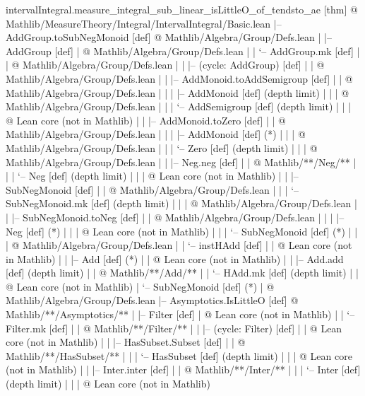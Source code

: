 \documentclass[11pt,reqno]{amsart}
\begin{document}
\begin{verbatimbox}
intervalIntegral.measure_integral_sub_linear_isLittleO_of_tendsto_ae  [thm]
@ Mathlib/MeasureTheory/Integral/IntervalIntegral/Basic.lean
|-- AddGroup.toSubNegMonoid  [def]
@ Mathlib/Algebra/Group/Defs.lean
|   |-- AddGroup  [def]
|   @ Mathlib/Algebra/Group/Defs.lean
|   |   `-- AddGroup.mk  [def]
|   |   @ Mathlib/Algebra/Group/Defs.lean
|   |       |-- (cycle: AddGroup)  [def]
|   |       @ Mathlib/Algebra/Group/Defs.lean
|   |       |-- AddMonoid.toAddSemigroup  [def]
|   |       @ Mathlib/Algebra/Group/Defs.lean
|   |       |   |-- AddMonoid  [def]   (depth limit)
|   |       |   @ Mathlib/Algebra/Group/Defs.lean
|   |       |   `-- AddSemigroup  [def]   (depth limit)
|   |       |   @ Lean core (not in Mathlib)
|   |       |-- AddMonoid.toZero  [def]
|   |       @ Mathlib/Algebra/Group/Defs.lean
|   |       |   |-- AddMonoid  [def]   (*)
|   |       |   @ Mathlib/Algebra/Group/Defs.lean
|   |       |   `-- Zero  [def]   (depth limit)
|   |       |   @ Mathlib/Algebra/Group/Defs.lean
|   |       |-- Neg.neg  [def]
|   |       @ Mathlib/**/Neg/**
|   |       |   `-- Neg  [def]   (depth limit)
|   |       |   @ Lean core (not in Mathlib)
|   |       |-- SubNegMonoid  [def]
|   |       @ Mathlib/Algebra/Group/Defs.lean
|   |       |   `-- SubNegMonoid.mk  [def]   (depth limit)
|   |       |   @ Mathlib/Algebra/Group/Defs.lean
|   |       |-- SubNegMonoid.toNeg  [def]
|   |       @ Mathlib/Algebra/Group/Defs.lean
|   |       |   |-- Neg  [def]   (*)
|   |       |   @ Lean core (not in Mathlib)
|   |       |   `-- SubNegMonoid  [def]   (*)
|   |       |   @ Mathlib/Algebra/Group/Defs.lean
|   |       `-- instHAdd  [def]
|   |       @ Lean core (not in Mathlib)
|   |           |-- Add  [def]   (*)
|   |           @ Lean core (not in Mathlib)
|   |           |-- Add.add  [def]   (depth limit)
|   |           @ Mathlib/**/Add/**
|   |           `-- HAdd.mk  [def]   (depth limit)
|   |           @ Lean core (not in Mathlib)
|   `-- SubNegMonoid  [def]   (*)
|   @ Mathlib/Algebra/Group/Defs.lean
|-- Asymptotics.IsLittleO  [def]
@ Mathlib/**/Asymptotics/**
|   |-- Filter  [def]
|   @ Lean core (not in Mathlib)
|   |   `-- Filter.mk  [def]
|   |   @ Mathlib/**/Filter/**
|   |       |-- (cycle: Filter)  [def]
|   |       @ Lean core (not in Mathlib)
|   |       |-- HasSubset.Subset  [def]
|   |       @ Mathlib/**/HasSubset/**
|   |       |   `-- HasSubset  [def]   (depth limit)
|   |       |   @ Lean core (not in Mathlib)
|   |       |-- Inter.inter  [def]
|   |       @ Mathlib/**/Inter/**
|   |       |   `-- Inter  [def]   (depth limit)
|   |       |   @ Lean core (not in Mathlib)

\end{verbatimbox}
\end{document}
